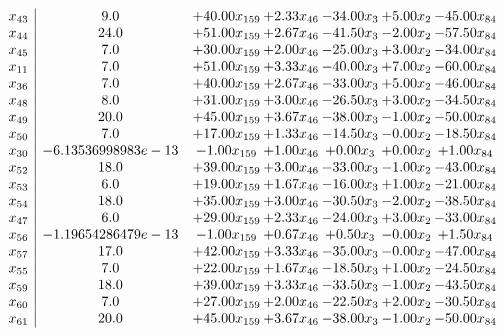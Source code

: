\documentclass[8pt]{article}
\begin{document}
\[\begin{array}{c| c c@{\hskip 2pt} c@{\hskip 2pt} c@{\hskip 2pt} c@{\hskip 2pt} c@{\hskip 2pt} }
 x_{43}   &  9.0 & + 40.00 x_{159} & +  2.33 x_{46} & -34.00 x_{3} & +  5.00 x_{2} & -45.00 x_{84}\\
 x_{44}   &  24.0 & + 51.00 x_{159} & +  2.67 x_{46} & -41.50 x_{3} & -2.00 x_{2} & -57.50 x_{84}\\
 x_{45}   &  7.0 & + 30.00 x_{159} & +  2.00 x_{46} & -25.00 x_{3} & +  3.00 x_{2} & -34.00 x_{84}\\
 x_{11}   &  7.0 & + 51.00 x_{159} & +  3.33 x_{46} & -40.00 x_{3} & +  7.00 x_{2} & -60.00 x_{84}\\
 x_{36}   &  7.0 & + 40.00 x_{159} & +  2.67 x_{46} & -33.00 x_{3} & +  5.00 x_{2} & -46.00 x_{84}\\
 x_{48}   &  8.0 & + 31.00 x_{159} & +  3.00 x_{46} & -26.50 x_{3} & +  3.00 x_{2} & -34.50 x_{84}\\
 x_{49}   &  20.0 & + 45.00 x_{159} & +  3.67 x_{46} & -38.00 x_{3} & -1.00 x_{2} & -50.00 x_{84}\\
 x_{50}   &  7.0 & + 17.00 x_{159} & +  1.33 x_{46} & -14.50 x_{3} & -0.00 x_{2} & -18.50 x_{84}\\
 x_{30}   &  -6.13536998983e-13 & -1.00 x_{159} & +  1.00 x_{46} & +  0.00 x_{3} & +  0.00 x_{2} & +  1.00 x_{84}\\
 x_{52}   &  18.0 & + 39.00 x_{159} & +  3.00 x_{46} & -33.00 x_{3} & -1.00 x_{2} & -43.00 x_{84}\\
 x_{53}   &  6.0 & + 19.00 x_{159} & +  1.67 x_{46} & -16.00 x_{3} & +  1.00 x_{2} & -21.00 x_{84}\\
 x_{54}   &  18.0 & + 35.00 x_{159} & +  3.00 x_{46} & -30.50 x_{3} & -2.00 x_{2} & -38.50 x_{84}\\
 x_{47}   &  6.0 & + 29.00 x_{159} & +  2.33 x_{46} & -24.00 x_{3} & +  3.00 x_{2} & -33.00 x_{84}\\
 x_{56}   &  -1.19654286479e-13 & -1.00 x_{159} & +  0.67 x_{46} & +  0.50 x_{3} & -0.00 x_{2} & +  1.50 x_{84}\\
 x_{57}   &  17.0 & + 42.00 x_{159} & +  3.33 x_{46} & -35.00 x_{3} & -0.00 x_{2} & -47.00 x_{84}\\
 x_{55}   &  7.0 & + 22.00 x_{159} & +  1.67 x_{46} & -18.50 x_{3} & +  1.00 x_{2} & -24.50 x_{84}\\
 x_{59}   &  18.0 & + 39.00 x_{159} & +  3.33 x_{46} & -33.50 x_{3} & -1.00 x_{2} & -43.50 x_{84}\\
 x_{60}   &  7.0 & + 27.00 x_{159} & +  2.00 x_{46} & -22.50 x_{3} & +  2.00 x_{2} & -30.50 x_{84}\\
 x_{61}   &  20.0 & + 45.00 x_{159} & +  3.67 x_{46} & -38.00 x_{3} & -1.00 x_{2} & -50.00 x_{84}\\

\end{array}\]
\end{document}
